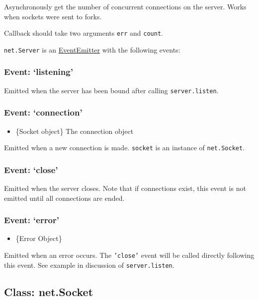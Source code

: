 Asynchronously get the number of concurrent connections on the server.
Works when sockets were sent to forks.

Callback should take two arguments \texttt{err} and \texttt{count}.

\texttt{net.Server} is an
\href{events.html\#events_class_events_eventemitter}{EventEmitter} with
the following events:

\subsubsection{Event: `listening'}\label{event-listening}

Emitted when the server has been bound after calling
\texttt{server.listen}.

\subsubsection{Event: `connection'}\label{event-connection}

\begin{itemize}
\itemsep1pt\parskip0pt
\item
  \{Socket object\} The connection object
\end{itemize}

Emitted when a new connection is made. \texttt{socket} is an instance of
\texttt{net.Socket}.

\subsubsection{Event: `close'}\label{event-close}

Emitted when the server closes. Note that if connections exist, this
event is not emitted until all connections are ended.

\subsubsection{Event: `error'}\label{event-error}

\begin{itemize}
\itemsep1pt\parskip0pt
\item
  \{Error Object\}
\end{itemize}

Emitted when an error occurs. The \texttt{'close'} event will be called
directly following this event. See example in discussion of
\texttt{server.listen}.

\subsection{Class: net.Socket}\label{class-net.socket}

